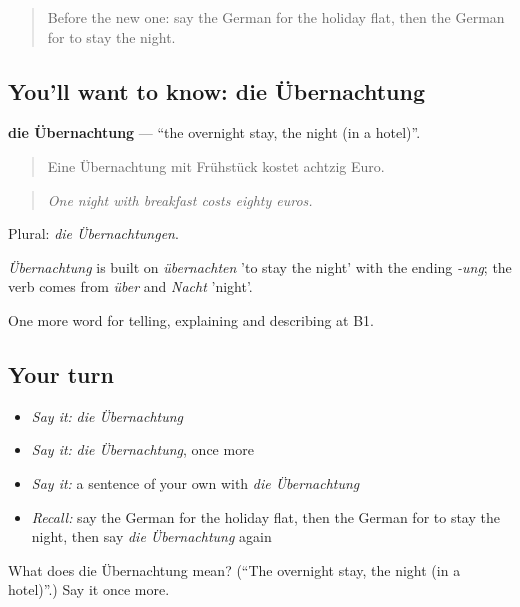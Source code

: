 \begin{quote}
Before the new one: say the German for the holiday flat, then the German for to stay the night.
\end{quote}

\subsection*{You'll want to know: die Übernachtung}
\textbf{die Übernachtung} — \textquotedblleft{}the overnight stay, the night (in a hotel)\textquotedblright{}.

\begin{quote}
Eine Übernachtung mit Frühstück kostet achtzig Euro.
\end{quote}

\begin{quote}
\emph{One night with breakfast costs eighty euros.}
\end{quote}

Plural: \emph{die Übernachtungen}.

\begin{cousinweb}
\emph{Übernachtung} is built on \emph{übernachten} 'to stay the night' with the ending \emph{-ung}; the verb comes from \emph{über} and \emph{Nacht} 'night'.
\end{cousinweb}

\begin{grammarlens}[title={What you've built}]
One more word for telling, explaining and describing at B1.
\end{grammarlens}

\subsection*{Your turn}
\begin{itemize}
\raggedright
  \item \emph{Say it:} \emph{die Übernachtung}
  \item \emph{Say it:} \emph{die Übernachtung}, once more
  \item \emph{Say it:} a sentence of your own with \emph{die Übernachtung}
  \item \emph{Recall:} say the German for the holiday flat, then the German for to stay the night, then say \emph{die Übernachtung} again
\end{itemize}

\begin{tcolorbox}[breakable,colback=teal!4,colframe=teal!35!black,title={Before you move on}]
What does die Übernachtung mean? (\textquotedblleft{}The overnight stay, the night (in a hotel)\textquotedblright{}.) Say it once more.
\end{tcolorbox}
